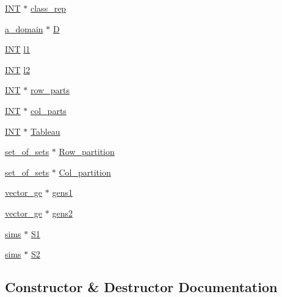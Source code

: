 \begin{DoxyCompactItemize}
\item 
\mbox{\hyperlink{galois_8h_a09fddde158a3a20bd2dcadb609de11dc}{I\+NT}} $\ast$ \mbox{\hyperlink{classyoung_a7f2cbc5545096f798a95f25c6928cccc}{class\+\_\+rep}}
\item 
\mbox{\hyperlink{classa__domain}{a\+\_\+domain}} $\ast$ \mbox{\hyperlink{classyoung_a3c0a311662ed89e7f2f08063ca43c6c6}{D}}
\item 
\mbox{\hyperlink{galois_8h_a09fddde158a3a20bd2dcadb609de11dc}{I\+NT}} \mbox{\hyperlink{classyoung_a46b91862e7329cfd417d44c8ab5adcfa}{l1}}
\item 
\mbox{\hyperlink{galois_8h_a09fddde158a3a20bd2dcadb609de11dc}{I\+NT}} \mbox{\hyperlink{classyoung_a871246c4686a1a4709a4d2b2a5f3bf15}{l2}}
\item 
\mbox{\hyperlink{galois_8h_a09fddde158a3a20bd2dcadb609de11dc}{I\+NT}} $\ast$ \mbox{\hyperlink{classyoung_a70a3bc5bc0374ff9e350d8a3874d6df7}{row\+\_\+parts}}
\item 
\mbox{\hyperlink{galois_8h_a09fddde158a3a20bd2dcadb609de11dc}{I\+NT}} $\ast$ \mbox{\hyperlink{classyoung_aca66cc34971ab6d73900265d02751856}{col\+\_\+parts}}
\item 
\mbox{\hyperlink{galois_8h_a09fddde158a3a20bd2dcadb609de11dc}{I\+NT}} $\ast$ \mbox{\hyperlink{classyoung_a69c5ae2e0462ffeb101184aef3f0efa8}{Tableau}}
\item 
\mbox{\hyperlink{classset__of__sets}{set\+\_\+of\+\_\+sets}} $\ast$ \mbox{\hyperlink{classyoung_ac624b1fad588941f5cf8c2abeafa30fc}{Row\+\_\+partition}}
\item 
\mbox{\hyperlink{classset__of__sets}{set\+\_\+of\+\_\+sets}} $\ast$ \mbox{\hyperlink{classyoung_af1db0e9cab979968ce7fbe07029d0b34}{Col\+\_\+partition}}
\item 
\mbox{\hyperlink{classvector__ge}{vector\+\_\+ge}} $\ast$ \mbox{\hyperlink{classyoung_abf7a41998c8722217dee8aff5a7f56e9}{gens1}}
\item 
\mbox{\hyperlink{classvector__ge}{vector\+\_\+ge}} $\ast$ \mbox{\hyperlink{classyoung_aefbc66e2577e6952604398b9cd5ac887}{gens2}}
\item 
\mbox{\hyperlink{classsims}{sims}} $\ast$ \mbox{\hyperlink{classyoung_a5afcd66990568aebac39bcffc559dc67}{S1}}
\item 
\mbox{\hyperlink{classsims}{sims}} $\ast$ \mbox{\hyperlink{classyoung_a675673220378bdcd6d7e71740840fca4}{S2}}
\end{DoxyCompactItemize}


\subsection{Constructor \& Destructor Documentation}
\mbox{\label{classyoung_a994102e0a50afbc1bad4ef51c05227ac}} 
